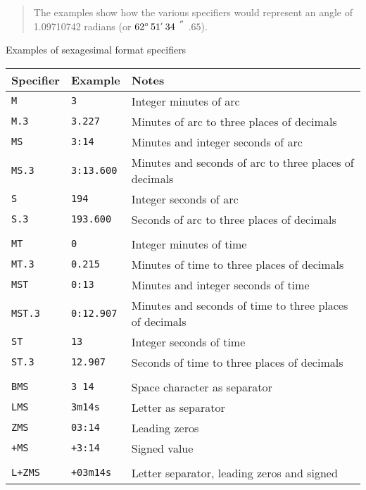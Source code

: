 \documentclass[twoside,11pt]{starlink}
\providecommand{\arcsec} {$\hspace{-0.05em}\raisebox{-0.5ex}
                     {$^{'\hspace{-0.1em}'}$}
                     \hspace{-0.7em}.\hspace{-0.05em}$}
\providecommand{\dms}[4] {$#1^{\circ}\,#2\raisebox{-0.5ex}{$^{'}$}\,#3\arcsec#4$}
\begin{document}
\begin{table}[htbp]
\begin{center}
\begin{quote}
The examples show how the various specifiers would represent an angle of
1.09710742 radians (or \dms{62}{51}{34}{65}).
\end{quote}

\caption{\label{SEXAG_EXAM}Examples of sexagesimal format specifiers}
\end{center}

\end{table}

\begin{table}[htbp]

\begin{center}
\begin{tabular}{lll}
Specifier   & Example        & Notes          \\ \hline
\texttt{M}     & \texttt{3}        & Integer minutes of arc \\
\texttt{M.3}   & \texttt{3.227}    & Minutes of arc to three places of decimals \\
\texttt{MS}    & \texttt{3:14}     & Minutes and integer seconds of arc \\
\texttt{MS.3}  & \texttt{3:13.600} & Minutes and seconds of arc to three places of decimals \\
\texttt{S}     & \texttt{194}      & Integer seconds of arc \\
\texttt{S.3}   & \texttt{193.600}  & Seconds of arc to three places of decimals \\
            &                & \\
\texttt{MT}    & \texttt{0}        & Integer minutes of time \\
\texttt{MT.3}  & \texttt{0.215}    & Minutes of time to three places of decimals \\
\texttt{MST}   & \texttt{0:13}     & Minutes and integer seconds of time\\
\texttt{MST.3} & \texttt{0:12.907} & Minutes and seconds of time to three places of decimals \\
\texttt{ST}    & \texttt{13}       & Integer seconds of time \\
\texttt{ST.3}  & \texttt{12.907}   & Seconds of time to three places of decimals \\
            &                & \\
\texttt{BMS}   & \texttt{3 14}     & Space character as separator \\
\texttt{LMS}   & \texttt{3m14s}    & Letter as separator \\
\texttt{ZMS}   & \texttt{03:14}    & Leading zeros \\
\texttt{+MS}   & \texttt{+3:14}    & Signed value \\
            &                & \\
\texttt{L+ZMS} & \texttt{+03m14s}  & Letter separator, leading zeros and signed \\
\end{tabular}


\end{center}
\end{table}
\end{document}
